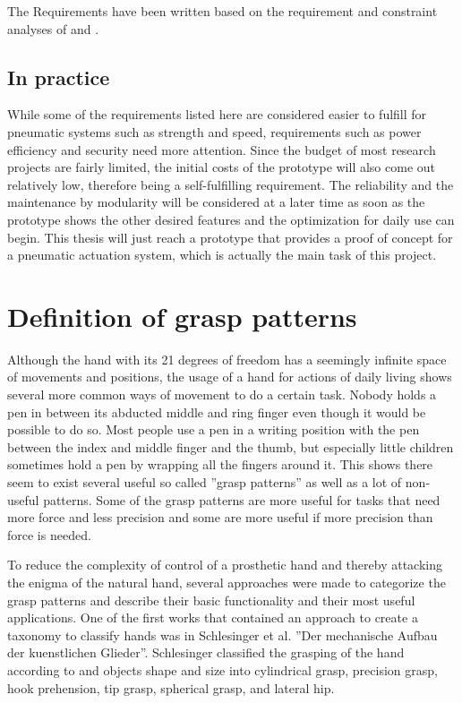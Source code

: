 \documentclass[main]{subfiles}
\begin{document}
The Requirements have been written based on the requirement and constraint analyses of \cite{Jacobsen1985} and \cite{Misra2010}.

\subsection{In practice}
While some of the requirements listed here are considered easier to fulfill for pneumatic systems such as strength and speed, requirements such as power efficiency and security need more attention. Since the budget of most research projects are fairly limited, the initial costs of the prototype will also come out relatively low, therefore being a self-fulfilling requirement. The reliability and the maintenance by modularity will be considered at a later time as soon as the prototype shows the other desired features and the optimization for daily use can begin. This thesis will just reach a prototype that provides a proof of concept for a pneumatic actuation system, which is actually the main task of this project.

\section{Definition of grasp patterns}
\label{sec:grasp-patterns}
Although the hand with its 21 degrees of freedom has a seemingly infinite space of movements and positions, the usage of a hand for actions of daily living shows several more common ways of movement to do a certain task. Nobody holds a pen in between its abducted middle and ring finger even though it would be possible to do so. Most people use a pen in a writing position with the pen between the index and middle finger and the thumb, but especially little children sometimes hold a pen by wrapping all the fingers around it. This shows there seem to exist several useful so called ''grasp patterns'' as well as a lot of non-useful patterns. Some of the grasp patterns are more useful for tasks that need more force and less precision and some are more useful if more precision than force is needed.

To reduce the complexity of control of a prosthetic hand and thereby attacking the enigma of the natural hand, several approaches were made to categorize the grasp patterns and describe their basic functionality and their most useful applications. One of the first works that contained an approach to create a taxonomy to classify hands was in Schlesinger et al. ''Der mechanische Aufbau der kuenstlichen Glieder''\cite{Schlesinger}. Schlesinger classified the grasping of the hand according to and objects shape and size into cylindrical grasp, precision grasp, hook prehension, tip grasp, spherical grasp, and lateral hip.
\end{document}
